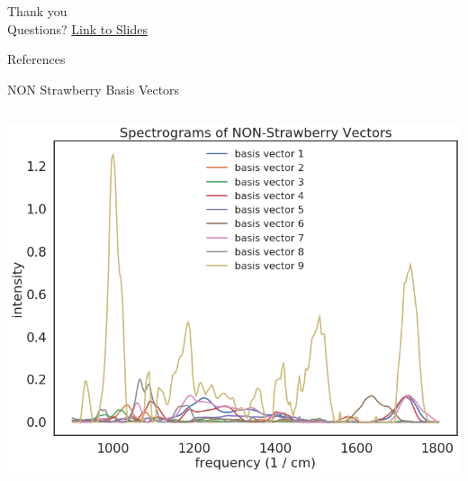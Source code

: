 \documentclass[aspectratio=169]{beamer}
\begin{document}

\begin{frame}[focus]
	Thank you \\
	Questions?
	\vfill
	\href{https://github.com/spirousschuh/presentations/blob/master/NMF_fruit_purees/presentation/fruit_purees.pdf}
		{\small{Link to Slides}}




\end{frame}


\appendix

\begin{frame}{References}
	\nocite{*} %
	
	
\end{frame}


\begin{frame}{NON Strawberry Basis Vectors}

	\begin{columns}

			\includegraphics[width=\linewidth]{images/non_strawberry_basis_vectors.png}
	\end{columns}
\end{frame}
\end{document}
